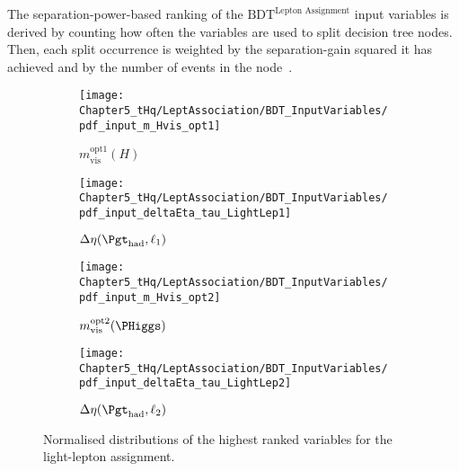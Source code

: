 The separation-power-based ranking of the $\text{BDT}^{\text{Lepton Assignment}}$ 
input variables is derived by counting how often the variables are used to 
split decision tree nodes. Then, each split occurrence is weighted by the separation-gain squared 
it has achieved and by the number of events in the node~\cite{Breiman1984ClassificationAR}.



\begin{figure}[h]
    \centering
    \begin{subfigure}[b]{0.42\textwidth}
        \centering
        \texttt{[image: Chapter5\_tHq/LeptAssociation/BDT\_InputVariables/pdf\_input\_m\_Hvis\_opt1]}
        \caption{$m^{\text{opt1}}_{\text{vis}}(H)$}
        \label{fig:ChaptH:LepAsign:SS:BDT:inputFeatuerRanked:m_H1}
    \end{subfigure}
    \hfill 
    \begin{subfigure}[b]{0.42\textwidth}
        \centering
        \texttt{[image: Chapter5\_tHq/LeptAssociation/BDT\_InputVariables/pdf\_input\_deltaEta\_tau\_LightLep1]}
        \caption{$\Delta \eta(\tauhad, \ell_{1})$}
        \label{fig:ChaptH:LepAsign:SS:BDT:inputFeatuerRanked:dEta1}
    \end{subfigure}
    
    \begin{subfigure}[b]{0.42\textwidth}
        \centering
        \texttt{[image: Chapter5\_tHq/LeptAssociation/BDT\_InputVariables/pdf\_input\_m\_Hvis\_opt2]}
        \caption{$m^{\text{opt2}}_{\text{vis}}(\PHiggs)$}
        \label{ffig:ChaptH:LepAsign:SS:BDT:inputFeatuerRanked:m_H2}
    \end{subfigure}
    \hfill
    \begin{subfigure}[b]{0.42\textwidth}
        \centering
        \texttt{[image: Chapter5\_tHq/LeptAssociation/BDT\_InputVariables/pdf\_input\_deltaEta\_tau\_LightLep2]}
        \caption{$\Delta \eta(\tauhad, \ell_{2})$}
        \label{fig:ChaptH:LepAsign:SS:BDT:inputFeatuerRanked:dEta2}
    \end{subfigure}
    \caption{Normalised distributions of the highest ranked variables for the light-lepton assignment.}
    \label{fig:ChaptH:LepAsign:SS:BDT:inputFeatuerRanked}
\end{figure}



